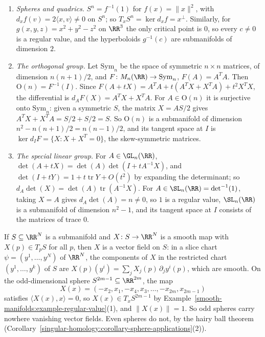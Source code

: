 \begin{example}\label{smooth-manifolds:example-regular-value}
\begin{enumerate}
\item \emph{Spheres and quadrics.} $S^n = f^{-1}(1)$ for $f(x) = \|x\|^2$, with $d_xf(v) = 2\langle x, v\rangle \neq 0$ on $S^n$; so
$T_xS^n = \ker d_xf = x^\perp$. Similarly, for $g(x, y, z) = x^2 + y^2 - z^2$ on $\RR^3$ the only critical point is $0$, so every $c \neq 0$ is a regular value,
and the hyperboloids $g^{-1}(c)$ are submanifolds of dimension $2$.
\item \emph{The orthogonal group.} Let $\mathrm{Sym}_n$ be the space of symmetric $n \times n$ matrices, of dimension $n(n + 1)/2$, and $F \colon M_n(\RR) \to
\mathrm{Sym}_n$, $F(A) = A^TA$. Then $\mathrm{O}(n) = F^{-1}(I)$. Since $F(A + tX) = A^TA + t(A^TX + X^TA) + t^2X^TX$, the differential is
$d_AF(X) = A^TX + X^TA$. For $A \in \mathrm{O}(n)$ it is surjective onto $\mathrm{Sym}_n$: given a symmetric $S$, the matrix $X = AS/2$ gives
$A^TX + X^TA = S/2 + S/2 = S$. So $\mathrm{O}(n)$ is a submanifold of dimension $n^2 - n(n + 1)/2 = n(n - 1)/2$, and its tangent space at $I$ is
$\ker d_IF = \{X : X + X^T = 0\}$, the skew-symmetric matrices.
\item \emph{The special linear group.} For $A \in \GL_n(\RR)$, $\det(A + tX) = \det(A)\det(I + tA^{-1}X)$, and $\det(I + tY) = 1 + t\operatorname{tr}Y + O(t^2)$
by expanding the determinant; so $d_A\det(X) = \det(A)\operatorname{tr}(A^{-1}X)$. For $A \in \SL_n(\RR) = \det^{-1}(1)$, taking $X = A$ gives $d_A\det(A) = n
\neq 0$, so $1$ is a regular value, $\SL_n(\RR)$ is a submanifold of dimension $n^2 - 1$, and its tangent space at $I$ consists of the matrices of trace $0$.
\end{enumerate}
\end{example}

\begin{example}\label{smooth-manifolds:example-vector-field-odd-sphere}
If $S \subseteq \RR^N$ is a submanifold and $X \colon S \to \RR^N$ is a smooth map with $X(p) \in T_pS$ for all $p$, then $X$ is a vector field on $S$: in a
slice chart $\psi = (y^1, \ldots, y^N)$ of $\RR^N$, the components of $X$ in the restricted chart $(y^1, \ldots, y^k)$ of $S$ are
$X(p)(y^i) = \sum_j X_j(p)\,\partial_j y^i(p)$, which are smooth. On the odd-dimensional sphere $S^{2m-1} \subseteq \RR^{2m}$, the map
\[
X(x) = (-x_2, x_1, -x_4, x_3, \ldots, -x_{2m}, x_{2m-1})
\]
satisfies $\langle X(x), x\rangle = 0$, so $X(x) \in T_xS^{2m-1}$ by Example~\ref{smooth-manifolds:example-regular-value}(1), and $\|X(x)\| = 1$. So odd
spheres carry nowhere vanishing vector fields. Even spheres do not, by the hairy ball theorem
(Corollary~\ref{singular-homology:corollary-sphere-applications}(2)).
\end{example}

